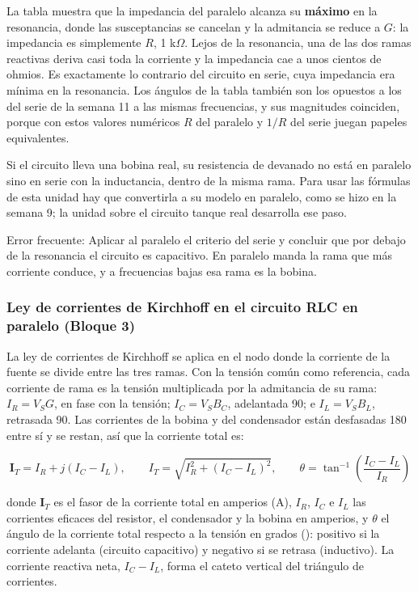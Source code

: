 \documentclass[11pt,letterpaper]{article}
\begin{document}
La tabla muestra que la impedancia del paralelo alcanza su \textbf{máximo} en la resonancia, donde las susceptancias se cancelan y la admitancia se reduce a $G$: la impedancia es simplemente $R$, 1 k\ensuremath{\Omega}. Lejos de la resonancia, una de las dos ramas reactivas deriva casi toda la corriente y la impedancia cae a unos cientos de ohmios. Es exactamente lo contrario del circuito en serie, cuya impedancia era mínima en la resonancia. Los ángulos de la tabla también son los opuestos a los del serie de la semana 11 a las mismas frecuencias, y sus magnitudes coinciden, porque con estos valores numéricos $R$ del paralelo y $1/R$ del serie juegan papeles equivalentes.

Si el circuito lleva una bobina real, su resistencia de devanado no está en paralelo sino en serie con la inductancia, dentro de la misma rama. Para usar las fórmulas de esta unidad hay que convertirla a su modelo en paralelo, como se hizo en la semana 9; la unidad sobre el circuito tanque real desarrolla ese paso.

\begin{nota}{Error frecuente:}
Aplicar al paralelo el criterio del serie y concluir que por debajo de la resonancia el circuito es capacitivo. En paralelo manda la rama que más corriente conduce, y a frecuencias bajas esa rama es la bobina.
\end{nota}

\subsubsection{Ley de corrientes de Kirchhoff en el circuito RLC en paralelo (Bloque 3)}

La ley de corrientes de Kirchhoff se aplica en el nodo donde la corriente de la fuente se divide entre las tres ramas. Con la tensión común como referencia, cada corriente de rama es la tensión multiplicada por la admitancia de su rama: $I_R = V_S G$, en fase con la tensión; $I_C = V_S B_C$, adelantada 90\textdegree{}; e $I_L = V_S B_L$, retrasada 90\textdegree{}. Las corrientes de la bobina y del condensador están desfasadas 180\textdegree{} entre sí y se restan, así que la corriente total es:

\begin{equation}
  \mathbf{I}_T = I_R + j(I_C - I_L), \qquad I_T = \sqrt{I_R^{2} + (I_C - I_L)^{2}}, \qquad \theta = \tan^{-1}\!\left(\frac{I_C - I_L}{I_R}\right)
\end{equation}

donde $\mathbf{I}_T$ es el fasor de la corriente total en amperios (A), $I_R$, $I_C$ e $I_L$ las corrientes eficaces del resistor, el condensador y la bobina en amperios, y $\theta$ el ángulo de la corriente total respecto a la tensión en grados (\textdegree{}): positivo si la corriente adelanta (circuito capacitivo) y negativo si se retrasa (inductivo). La corriente reactiva neta, $I_C - I_L$, forma el cateto vertical del triángulo de corrientes.
\end{document}
